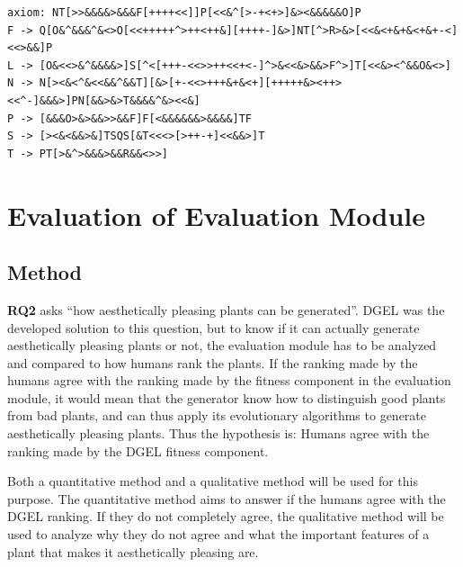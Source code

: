 \begin{lstlisting}[caption=L-system representation of plant in Figure~\ref{fig:sa-plant}, label=lst:sa-plant, float]
axiom: NT[>>&&&&>&&&F[++++<<]]P[<<&^[>-+<+>]&><&&&&&O]P
F -> Q[O&^&&&^&<>O[<<+++++^>++<++&][++++-]&>]NT[^>R>&>[<<&<+&+&<+&+-<]<<>&&]P
L -> [O&<<>&^&&&&>]S[^<[+++-<<>>++<<+<-]^>&<<&>&&>F^>]T[<<&><^&&O&<>]
N -> N[><&<^&<<&&^&&T][&>[+-<<>+++&+&<+][+++++&><++><<^-]&&&>]PN[&&>&>T&&&&^&><<&]
P -> [&&&O>&>&&>>&&F]F[<&&&&&&>&&&&]TF
S -> [><&<&&>&]TSQS[&T<<<>[>++-+]<<&&>]T
T -> PT[>&^>&&&>&&R&&<>>]
\end{lstlisting}

\section{Evaluation of Evaluation Module}
\subsection{Method}
\textbf{RQ2} asks ``how aesthetically pleasing plants can be generated''.
DGEL was the developed solution to this question, but to know if it can actually generate aesthetically pleasing plants or not, the evaluation module has to be analyzed and compared to how humans rank the plants.
If the ranking made by the humans agree with the ranking made by the fitness component in the evaluation module, it would mean that the generator know how to distinguish good plants from bad plants, and can thus apply its evolutionary algorithms to generate aesthetically pleasing plants.
Thus the hypothesis is: Humans agree with the ranking made by the DGEL fitness component.

Both a quantitative method and a qualitative method will be used for this purpose.
The quantitative method aims to answer if the humans agree with the DGEL ranking.
If they do not completely agree, the qualitative method will be used to analyze why they do not agree and what the important features of a plant that makes it aesthetically pleasing are.

